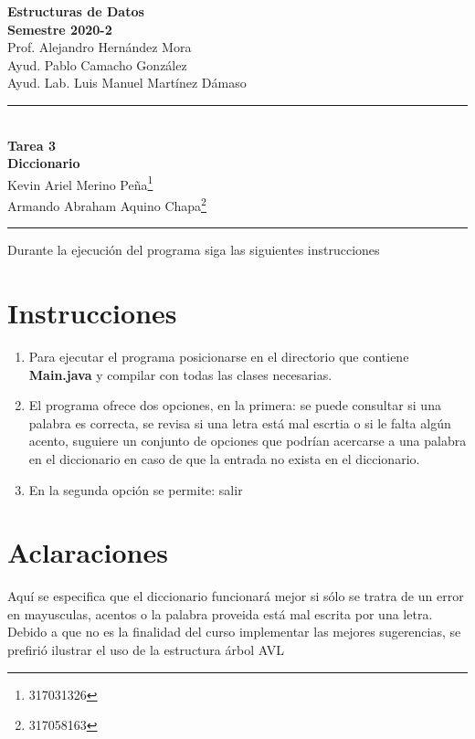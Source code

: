 \documentclass[letterpaper,11pt]{article}
\begin{document}
\begin{center}
\vspace{-134pt}
\textbf{\large Estructuras de Datos}\\[0.2cm]
\textbf{ Semestre 2020-2}\\[0.2cm]
Prof. Alejandro Hernández Mora\\[0.2cm]
Ayud. Pablo Camacho González  \\ [0.2cm]
Ayud. Lab. Luis Manuel Martínez Dámaso   \\ [0.2cm]
\rule{17cm}{0.3mm}\\
\textbf{Tarea 3}\\
\huge\textbf{Diccionario}\\[0.1cm]
\normalsize Kevin Ariel Merino Peña\footnote{317031326}\\
Armando Abraham Aquino Chapa\footnote{317058163}\\
\end{center}
\vspace{-10pt}
\rule{17cm}{0.3mm}
\begin{flushright}
\vspace{-3pt}
\end{flushright}

\noindent Durante la ejecución del programa siga las siguientes instrucciones

\section*{Instrucciones}

\begin{enumerate}

\item Para ejecutar el programa posicionarse en el directorio que contiene \textbf{Main.java} y compilar con todas las clases necesarias.

\item El programa ofrece dos opciones, en la primera: se puede consultar si una palabra es correcta, se revisa si una letra está mal escrtia o si le falta algún acento, suguiere un conjunto de opciones que podrían acercarse a una palabra en el diccionario en caso de que la entrada no exista en el diccionario.

\item En la segunda opción se permite: salir

\end{enumerate}
\section*{Aclaraciones}
	Aquí se especifica que el diccionario funcionará mejor si sólo se tratra de un error en mayusculas, acentos o la palabra
	proveida está mal escrita por una letra. Debido a que no es la finalidad del curso implementar las mejores sugerencias, se prefirió
	ilustrar el uso de la estructura árbol AVL
\end{document}
